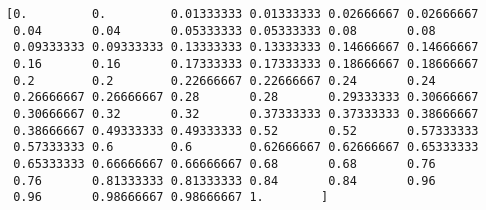 \documentclass[11pt]{article}
\begin{document}
    \begin{Verbatim}[commandchars=\\\{\}]
[0.         0.         0.01333333 0.01333333 0.02666667 0.02666667
 0.04       0.04       0.05333333 0.05333333 0.08       0.08
 0.09333333 0.09333333 0.13333333 0.13333333 0.14666667 0.14666667
 0.16       0.16       0.17333333 0.17333333 0.18666667 0.18666667
 0.2        0.2        0.22666667 0.22666667 0.24       0.24
 0.26666667 0.26666667 0.28       0.28       0.29333333 0.30666667
 0.30666667 0.32       0.32       0.37333333 0.37333333 0.38666667
 0.38666667 0.49333333 0.49333333 0.52       0.52       0.57333333
 0.57333333 0.6        0.6        0.62666667 0.62666667 0.65333333
 0.65333333 0.66666667 0.66666667 0.68       0.68       0.76
 0.76       0.81333333 0.81333333 0.84       0.84       0.96
 0.96       0.98666667 0.98666667 1.        ]

    \end{Verbatim}

    \begin{center}
    \end{center}
    { \hspace*{\fill} \\}
    

    
    
    
    
\end{document}
